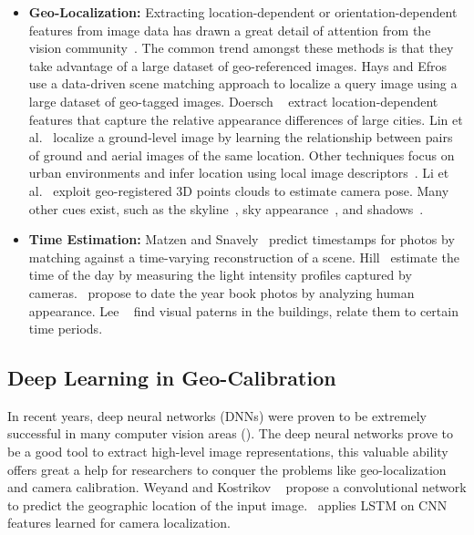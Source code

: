 \begin{itemize}[noitemsep]
\item \textbf{Geo-Localization:}
Extracting location-dependent or orientation-dependent features from
image data has drawn a great detail of attention from the vision
community~\cite{jacobs07geolocate, jacobs11geolocate,
jacobs08geoorient}. The common trend amongst these methods is that
they take advantage of a large dataset of geo-referenced images. Hays
and Efros~\cite{hays2008im2gps} use a data-driven scene matching
approach to localize a query image using a large dataset of geo-tagged
images.  Doersch \etal~\cite{doersch2012what} extract
location-dependent features that capture the relative appearance
differences of large cities.  Lin et al.~\cite{lin2013cross} localize
a ground-level image by learning the relationship between pairs of
ground and aerial images of the same location. Other techniques focus
on urban environments and infer location using local image
descriptors~\cite{schindler2008detecting,snavely2006photo}. Li et
al.~\cite{li2012worldwide} exploit geo-registered 3D points clouds to
estimate camera pose. Many other cues exist, such as the
skyline~\cite{baatz2012large,ramalingam2009geolocalization}, sky
appearance~\cite{lalonde2010sun,workman2014rainbow}, and
shadows~\cite{junejo2008estimating,wu2010geo}.
\newline

\item \textbf{Time Estimation:}
Matzen and Snavely~\cite{matzen2014scene} predict
timestamps for photos by matching against a time-varying
reconstruction of a scene.  Hill~\cite{hill1994elephant} estimate the
time of the day by measuring the light intensity profiles captured by
cameras.~\cite{salem2016face2year,ginosar2015century} propose to date the
year book photos by analyzing human appearance. Lee
\etal~\cite{linking2015iccp} find visual paterns in the buildings,
relate them to certain time periods.

\end{itemize}

\subsection{Deep Learning in Geo-Calibration}
In recent years, deep neural networks (DNNs) were proven to be
extremely successful in many computer vision areas (). 
The deep neural networks prove to be a good tool to extract high-level
image representations, this valuable ability offers great a help for
researchers to conquer the problems like geo-localization and camera
calibration.
Weyand and Kostrikov \etal~\cite{planet} propose a convolutional
network to predict the geographic location of the input
image.~\cite{walch2017image} applies LSTM on CNN features learned for
camera localization.

